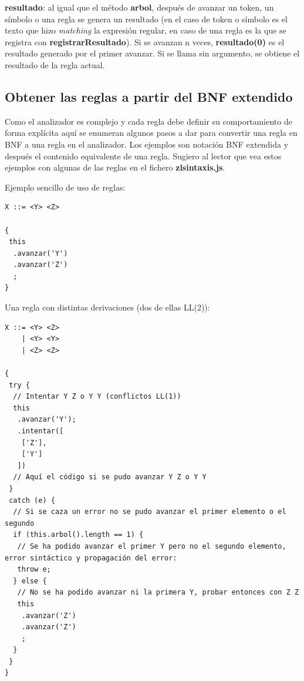 \documentclass{report}
\begin{document}
	\vspace{10px}
	\textbf{resultado}: al igual que el método \textbf{arbol}, después de avanzar un token, un símbolo o una regla se genera un resultado (en el caso de token o símbolo es el texto que hizo \textit{matching} la expresión regular, en caso de una regla es la que se registra con \textbf{registrarResultado}). Si se avanzan n veces, \textbf{resultado(0)} es el resultado generado por el primer avanzar. Si se llama sin argumento, se obtiene el resultado de la regla actual.
	
	\subsection{Obtener las reglas a partir del BNF extendido}
	
	Como el analizador es complejo y cada regla debe definir su comportamiento de forma explícita aquí se enumeran algunos pasos a dar para convertir una regla en BNF a una regla en el analizador. Los ejemplos son notación BNF extendida y después el contenido equivalente de una regla. Sugiero al lector que vea estos ejemplos con algunas de las reglas en el fichero \textbf{zlsintaxis.js}.
	
	\vspace{10px}
	
	Ejemplo sencillo de uso de reglas:
	
	\begin{BVerbatim}
X ::= <Y> <Z>

{
 this
  .avanzar('Y')
  .avanzar('Z')
  ;
}
	\end{BVerbatim}

	\vspace{10px}
	Una regla con distintas derivaciones (dos de ellas LL(2)):
	
	\begin{BVerbatim}
X ::= <Y> <Z>
    | <Y> <Y>
    | <Z> <Z>
    
{
 try {
  // Intentar Y Z o Y Y (conflictos LL(1))
  this
   .avanzar('Y');
   .intentar([
    ['Z'],
    ['Y']
   ])
  // Aquí el código si se pudo avanzar Y Z o Y Y
 }
 catch (e) {
  // Si se caza un error no se pudo avanzar el primer elemento o el segundo
  if (this.arbol().length == 1) {
   // Se ha podido avanzar el primer Y pero no el segundo elemento, error sintáctico y propagación del error:
   throw e;
  } else {
   // No se ha podido avanzar ni la primera Y, probar entonces con Z Z
   this
    .avanzar('Z')
    .avanzar('Z')
	;
  }
 }
}
	\end{BVerbatim}
	
\end{document}

